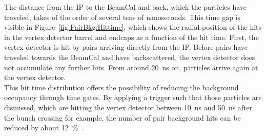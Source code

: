 The distance from the IP to the BeamCal and back, which the particles have traveled, takes of the order of several tens of nanoseconds.
This time gap is visible in Figure~\ref{fig:PairBkg:Hittime}, which shows the radial position of the hits in the vertex detector barrel and endcaps as a function of the hit time.
First, the vertex detector is hit by \positron\electron pairs arriving directly from the IP.
Before pairs have traveled towards the BeamCal and have backscattered, the vertex detector does not accumulate any further hits.
From around \SI{20}{\nano\second} on, particles arrive again at the vertex detector.
\\This hit time distribution offers the possibility of reducing the background occupancy through time gates.
By applying a trigger such that those particles are dismissed, which are hitting the vertex detector between \SI{10}{\nano\second} and \SI{50}{\nano\second} after the bunch crossing for example, the number of pair background hits can be reduced by about \SI{12}{\percent}~\cite[p. 27]{SiDBkgNote}.
